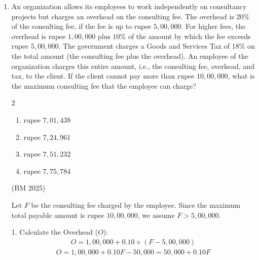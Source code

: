 \begin{enumerate}[label=\thesubsection.\arabic*, ref=\thesubsection.\theenumi]
\begin{lstlisting}
Codes/bm25.py
\end{lstlisting}



\item An organization allows its employees to work independently on consultancy projects but charges an overhead on the consulting fee. The overhead is $20\%$ of the consulting fee, if the fee is up to $\text{rupee } 5,00,000$. For higher fees, the overhead is $\text{rupee } 1,00,000$ plus $10\%$ of the amount by which the fee exceeds $\text{rupee } 5,00,000$. The government charges a Goods and Services Tax of $18\%$ on the total amount (the consulting fee plus the overhead). An employee of the organization charges this entire amount, i.e., the consulting fee, overhead, and tax, to the client. If the client cannot pay more than $\text{rupee } 10,00,000$, what is the maximum consulting fee that the employee can charge?

\begin{multicols}{2}
\begin{enumerate}
\setlength{\itemsep}{0pt}
    \item[(a)] $\text{rupee } 7,01,438$
    \item[(b)] $\text{rupee } 7,24,961$
    \item[(c)] $\text{rupee } 7,51,232$
    \item[(d)] $\text{rupee } 7,75,784$
\end{enumerate}
\end{multicols}

\hfill  (BM 2025)


\solution

Let $F$ be the consulting fee charged by the employee. Since the maximum total payable amount is $\text{rupee } 10,00,000$, we assume $F > 5,00,000$.

1. Calculate the Overhead ($O$):
\begin{align}
O = 1,00,000 + 0.10 \times (F - 5,00,000)
\end{align}
\begin{align}
O = 1,00,000 + 0.10F - 50,000 = 50,000 + 0.10F
\end{align}


\end{enumerate}
